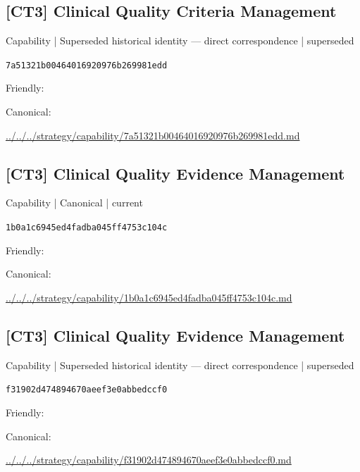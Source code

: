 \documentclass[10pt,a4paper]{article}
\begin{document}
\subsection*{[CT3] Clinical Quality Criteria Management}
{\small Capability | Superseded historical identity — direct correspondence | superseded}\par
\texttt{7a51321b00464016920976b269981edd}\par
Friendly: \par
Canonical: \par
{\footnotesize\url{../../../strategy/capability/7a51321b00464016920976b269981edd.md}}\par
\subsection*{[CT3] Clinical Quality Evidence Management}
{\small Capability | Canonical | current}\par
\texttt{1b0a1c6945ed4fadba045ff4753c104c}\par
Friendly: \par
Canonical: \par
{\footnotesize\url{../../../strategy/capability/1b0a1c6945ed4fadba045ff4753c104c.md}}\par
\subsection*{[CT3] Clinical Quality Evidence Management}
{\small Capability | Superseded historical identity — direct correspondence | superseded}\par
\texttt{f31902d474894670aeef3e0abbedccf0}\par
Friendly: \par
Canonical: \par
{\footnotesize\url{../../../strategy/capability/f31902d474894670aeef3e0abbedccf0.md}}\par
\end{document}
